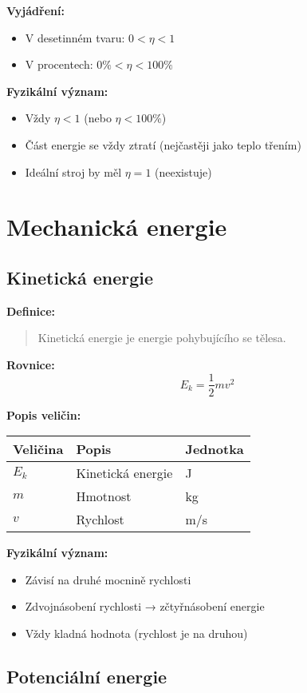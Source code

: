 \documentclass[11pt,a4paper]{article}
\begin{document}
\textbf{Vyjádření:}
\begin{itemize}
\item V desetinném tvaru: $0 < \eta < 1$
\item V procentech: $0\% < \eta < 100\%$
\end{itemize}

\textbf{Fyzikální význam:}
\begin{itemize}
\item Vždy $\eta < 1$ (nebo $\eta < 100\%$)
\item Část energie se vždy ztratí (nejčastěji jako teplo třením)
\item Ideální stroj by měl $\eta = 1$ (neexistuje)
\end{itemize}

\clearpage

\section{Mechanická energie}

\subsection{Kinetická energie}

\textbf{Definice:}
\begin{quote}
Kinetická energie je energie pohybujícího se tělesa.
\end{quote}

\textbf{Rovnice:}
\[E_k = \frac{1}{2}mv^2\]

\textbf{Popis veličin:}

\begin{longtable}{lll}
\toprule
Veličina & Popis & Jednotka \\
\midrule
$E_k$ & Kinetická energie & J \\
$m$ & Hmotnost & kg \\
$v$ & Rychlost & m/s \\
\bottomrule
\end{longtable}

\textbf{Fyzikální význam:}
\begin{itemize}
\item Závisí na druhé mocnině rychlosti
\item Zdvojnásobení rychlosti → zčtyřnásobení energie
\item Vždy kladná hodnota (rychlost je na druhou)
\end{itemize}

\subsection{Potenciální energie}
\end{document}
